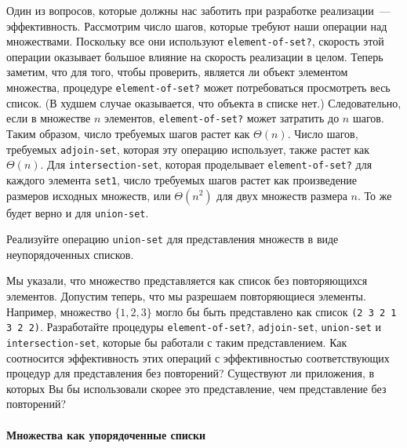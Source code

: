 Один из вопросов, которые должны нас заботить при
разработке реализации~--- эффективность.  Рассмотрим число шагов,
которые требуют наши операции над множествами.  Поскольку все они
используют {\tt element-of-set?}, скорость этой операции
оказывает большое влияние на скорость реализации в целом.  Теперь
заметим, что для того, чтобы проверить, является ли объект элементом
множества, процедуре {\tt element-of-set?} может потребоваться
просмотреть весь список. (В худшем случае оказывается, что объекта в
списке нет.)  Следовательно, если в множестве $n$
элементов,  {\tt element-of-set?} может затратить до
$n$ шагов.  Таким образом, число требуемых шагов растет как 
$\Theta (n)$.  Число шагов, требуемых
{\tt adjoin-set}, которая эту операцию использует, также растет 
как $\Theta (n)$.  Для {\tt intersection-set},
которая проделывает {\tt element-of-set?} для каждого элемента
{\tt set1}, число требуемых шагов растет как произведение
размеров исходных множеств, или $\Theta (n^2)$ для двух
множеств размера $n$.  То же будет верно и для
{\tt union-set}.
\begin{exercise}{2.59}\label{EX2.59}%
Реализуйте операцию  {\tt union-set} для
представления множеств в виде неупорядоченных списков.
\end{exercise}
\begin{exercise}{2.60}\label{EX2.60}%
Мы указали, что множество представляется как список без 
повторяющихся элементов. Допустим теперь, что мы разрешаем
повторяющиеся элементы. Например, множество $\{1, 2, 3\}$
могло бы быть представлено как список {\tt (2 3 2 1 3 2 2)}.
Разработайте процедуры {\tt element-of-set?},
{\tt adjoin-set}, {\tt union-set} и
{\tt intersection-set}, которые бы работали с таким
представлением.  Как соотносится эффективность этих операций с
эффективностью соответствующих процедур для представления без
повторений?  Существуют ли приложения, в которых Вы бы использовали
скорее это представление, чем представление без повторений?
\end{exercise}

\paragraph{Множества как упорядоченные списки}


